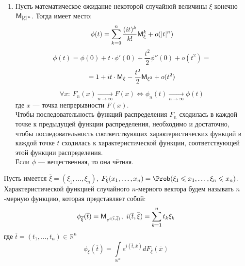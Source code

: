 \begin{enumerate}[wide, labelwidth=!, labelindent=0pt]
\item Пусть математическое ожидание некоторой случайной величины $\xi$ конечно $\mathsf{M}_{|\xi|^n}$. Тогда имеет место:
\[
	\phi(t) = \sum\limits_{k = 0}^{n} \frac{(it)^k}{k!} \mathsf{M}_{\xi}^k + o(|t|^n)
\]
\[
	\phi(t) = \phi(0) + t \cdot \phi'(0) + \frac{t^2}{2} \phi''(0) + o(t^2) = 
\]
\[
	= 1 + it \cdot \mathsf{M}_{\xi} - \frac{t^2}{2} \mathsf{M}_{\xi^2} + o(t^2)
\]

\begin{theorem}
	\[
		\forall x: \ F_n (x) \underset{n \to \infty}{\rightarrow} F(x) \Leftrightarrow \phi_n (t) \underset{n \to \infty}{\rightarrow} \phi(t)
	\]
где $x$ --- точка непрерывности $F(x)$. \\
Чтобы последовательность функций распределения $F_n$ сходилась в каждой точке к предыдущей функции распределения, необходимо и достаточно, чтобы последовательность соответствующих характеристических функций в каждой точке $t$ сходилась к характеристической функции, соответствующей этой функции распределения. \\
Если $\phi$ --- вещественная, то она чётная.
\end{theorem}
\end{enumerate}
\begin{definition}
	Пусть имеется $\overline{\xi} = (\xi_1, \ldots, \xi_n)$, $F_{\xi} (x_1, \ldots, x_n) = \Prob(\xi_1 \leqslant x_1, \ldots, \xi_n \leqslant x_n)$. Характеристической функцией случайного $n$-мерного вектора будем называть $n$-мерную функцию, которая представляет собой:
\[
	\phi_{\overline{\xi}} (\overline{t}) = \mathsf{M}_{e^{i(\overline{t}, \overline{\xi})}}, \ i(\overline{t}, \overline{\xi}) = \sum\limits_{k = 1}^{n} t_k \xi_k
\]
где $\overline{t} = (t_1, \ldots, t_n) \in \mathbb{R}^n$
\[
	\phi_{\xi} (\overline{t}) = \int\limits_{\mathbb{R}^n} e^{i(\overline{t}, \overline{x})} d F_{\overline{\xi}} (\overline{x})
\]
\end{definition}
